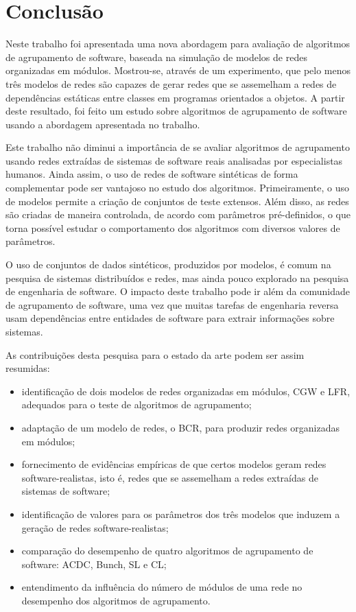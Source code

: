 

\chapter{Conclusão} \label{cap:conclusao}

Neste trabalho foi apresentada uma nova abordagem para avaliação de algoritmos de agrupamento de software, baseada na simulação de modelos de redes organizadas em módulos. Mostrou-se, através de um experimento, que pelo menos três modelos de redes são capazes de gerar redes que se assemelham a redes de dependências estáticas entre classes em programas orientados a objetos. A partir deste resultado, foi feito um estudo sobre algoritmos de agrupamento de software usando a abordagem apresentada no trabalho.

Este trabalho não diminui a importância de se avaliar algoritmos de agrupamento usando redes extraídas de sistemas de software reais analisadas por especialistas humanos. Ainda assim, o uso de redes de software sintéticas de forma complementar pode ser vantajoso no estudo dos algoritmos. Primeiramente, o uso de modelos permite a criação de conjuntos de teste extensos. Além disso, as redes são criadas de maneira controlada, de acordo com parâmetros pré-definidos, o que torna possível estudar o comportamento dos algoritmos com diversos valores de parâmetros.

O uso de conjuntos de dados sintéticos, produzidos por modelos, é comum na pesquisa de sistemas distribuídos e redes, mas ainda pouco explorado na pesquisa de engenharia de software. O impacto deste trabalho pode ir além da comunidade de agrupamento de software, uma vez que muitas tarefas de engenharia reversa usam dependências entre entidades de software para extrair informações sobre sistemas.

As contribuições desta pesquisa para o estado da arte podem ser assim resumidas:

\begin{itemize}
	\item identificação de dois modelos de redes organizadas em módulos, CGW e LFR, adequados para o teste de algoritmos de agrupamento;
	\item adaptação de um modelo de redes, o BCR, para produzir redes organizadas em módulos;
	\item fornecimento de evidências empíricas de que certos modelos geram redes software-realistas, isto é, redes que se assemelham a redes extraídas de sistemas de software;
	\item identificação de valores para os parâmetros dos três modelos que induzem a geração de redes software-realistas;
	\item comparação do desempenho de quatro algoritmos de agrupamento de software: ACDC, Bunch, SL e CL;
	\item entendimento da influência do número de módulos de uma rede no desempenho dos algoritmos de agrupamento.
\end{itemize}

